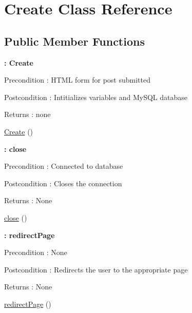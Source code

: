 \hypertarget{class_create}{}\section{Create Class Reference}
\label{class_create}
\subsection*{Public Member Functions}
\begin{Indent}{\bf \+: Create}\par
{\em \begin{DoxyPrecond}{Precondition}
\+: H\+T\+ML form for post submitted 
\end{DoxyPrecond}
\begin{DoxyPostcond}{Postcondition}
\+: Intitializes variables and My\+S\+QL database 
\end{DoxyPostcond}
\begin{DoxyReturn}{Returns}
\+: none 
\end{DoxyReturn}
}\begin{DoxyCompactItemize}
\item 
\hyperlink{class_create_ad01f71fa0ecc039494e3c282864298c3}{Create} ()
\end{DoxyCompactItemize}
\end{Indent}
\begin{Indent}{\bf \+: close}\par
{\em \begin{DoxyPrecond}{Precondition}
\+: Connected to database 
\end{DoxyPrecond}
\begin{DoxyPostcond}{Postcondition}
\+: Closes the connection 
\end{DoxyPostcond}
\begin{DoxyReturn}{Returns}
\+: None 
\end{DoxyReturn}
}\begin{DoxyCompactItemize}
\item 
\hyperlink{class_create_aa69c8bf1f1dcf4e72552efff1fe3e87e}{close} ()
\end{DoxyCompactItemize}
\end{Indent}
\begin{Indent}{\bf \+: redirect\+Page}\par
{\em \begin{DoxyPrecond}{Precondition}
\+: None 
\end{DoxyPrecond}
\begin{DoxyPostcond}{Postcondition}
\+: Redirects the user to the appropriate page 
\end{DoxyPostcond}
\begin{DoxyReturn}{Returns}
\+: None 
\end{DoxyReturn}
}\begin{DoxyCompactItemize}
\item 
\hyperlink{class_create_a7861c9f362036f0f145f12e70c3d63c3}{redirect\+Page} ()
\end{DoxyCompactItemize}
\end{Indent}
